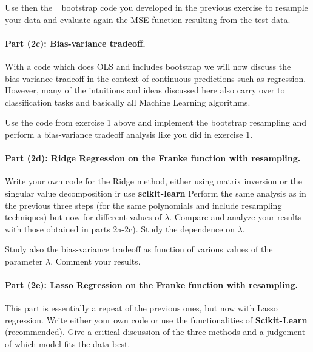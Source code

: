 \documentclass[%
oneside,                 %
final,                   %
10pt]{article}
\begin{document}
Use then the _bootstrap code you developed in the previous exercise to resample your data
and evaluate again the MSE function resulting
from the test data. 


\paragraph{Part (2c): Bias-variance tradeoff.}
With a code which does OLS and includes bootstrap
we will now discuss the bias-variance tradeoff in the context of
continuous predictions such as regression. However, many of the
intuitions and ideas discussed here also carry over to classification
tasks and basically all Machine Learning algorithms. 

Use the code from exercise 1 above and implement the bootstrap
resampling and perform a bias-variance tradeoff analysis like you did
in exercise 1.

\paragraph{Part (2d): Ridge Regression on the Franke function  with resampling.}
Write your own code for the Ridge method, either using matrix
inversion or the singular value decomposition ir use \textbf{scikit-learn} 
Perform the same analysis as in the
previous three steps (for the same polynomials and include resampling
techniques) but now for different values of $\lambda$. Compare and
analyze your results with those obtained in parts 2a-2c). Study the
dependence on $\lambda$.

Study also the bias-variance tradeoff as function of various values of
the parameter $\lambda$. Comment your results. 

\paragraph{Part (2e): Lasso Regression on the Franke function  with resampling.}
This part is essentially a repeat of the previous ones, but now
with Lasso regression. Write either your own code or
use the functionalities of \textbf{Scikit-Learn} (recommended). 
Give a
critical discussion of the three methods and a judgement of which
model fits the data best.







\end{document}
